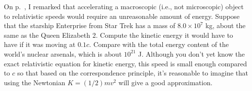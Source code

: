 %
On p.~\pageref{rel-spaceship-impractical}, 
I remarked that accelerating a macroscopic
(i.e., not microscopic) object to relativistic speeds
would require an unreasonable amount of energy.
Suppose that the starship Enterprise from Star Trek has a mass
of $8.0\times10^7$ kg, about the same as the Queen Elizabeth 2.
Compute the kinetic energy it would have to have if it
was moving at $0.1c$. Compare with the total
energy content of the world's nuclear arsenals, which is about $10^{21}$ J.
Although you don't yet know the exact relativistic equation for kinetic energy, this
speed is small enough compared to $c$
so that based on the correspondence principle,
it's reasonable to imagine that using the Newtonian
$K=(1/2)mv^2$ will give a good approximation.\answercheck
